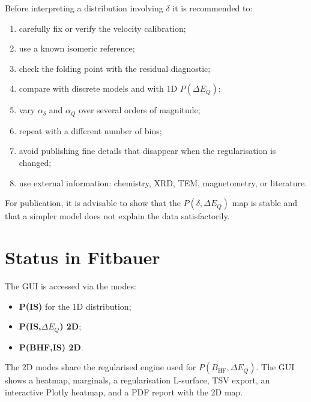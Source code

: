 \documentclass[11pt,a4paper]{article}
\newcommand{\IS}{\delta}
\newcommand{\QS}{\Delta E_Q}
\newcommand{\BHF}{B_{\mathrm{HF}}}
\begin{document}
Before interpreting a distribution involving $\IS$ it is recommended to:
\begin{enumerate}
  \item carefully fix or verify the velocity calibration;
  \item use a known isomeric reference;
  \item check the folding point with the residual diagnostic;
  \item compare with discrete models and with 1D $P(\QS)$;
  \item vary $\alpha_{\IS}$ and $\alpha_Q$ over several orders of magnitude;
  \item repeat with a different number of bins;
  \item avoid publishing fine details that disappear when the regularisation
  is changed;
  \item use external information: chemistry, XRD, TEM, magnetometry, or
  literature.
\end{enumerate}
For publication, it is advisable to show that the $P(\IS,\QS)$ map is stable
and that a simpler model does not explain the data satisfactorily.

\section{Status in Fitbauer}

The GUI is accessed via the modes:
\begin{itemize}
  \item \textbf{P(IS)} for the 1D distribution;
  \item \textbf{P(IS,$\Delta E_Q$) 2D};
  \item \textbf{P(BHF,IS) 2D}.
\end{itemize}
The 2D modes share the regularised engine used for $P(\BHF,\QS)$. The GUI
shows a heatmap, marginals, a regularisation L-surface, TSV export, an
interactive Plotly heatmap, and a PDF report with the 2D map.
\end{document}
